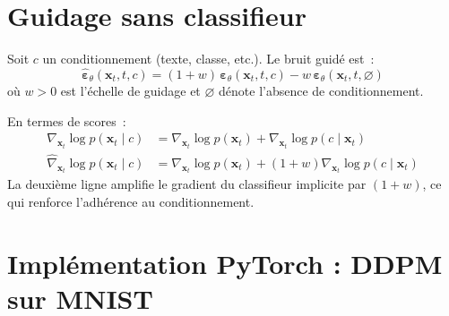 \section{Guidage sans classifieur}
\label{sec:cfg}

\begin{definition}
Soit $c$ un conditionnement (texte, classe, etc.). Le bruit guid\'e est~:
\begin{equation}
\hat{\boldsymbol{\varepsilon}}_\theta(\mathbf{x}_t, t, c) = (1 + w)\,\boldsymbol{\varepsilon}_\theta(\mathbf{x}_t, t, c) - w\,\boldsymbol{\varepsilon}_\theta(\mathbf{x}_t, t, \varnothing)
\label{eq:cfg}
\end{equation}
o\`u $w > 0$ est l'\'echelle de guidage et $\varnothing$ d\'enote l'absence
de conditionnement.
\end{definition}

\begin{mathbox}[title=\textbf{D\'erivation du guidage}]
En termes de scores~:
\begin{align}
\nabla_{\mathbf{x}_t} \log p(\mathbf{x}_t \mid c) &= \nabla_{\mathbf{x}_t} \log p(\mathbf{x}_t) + \nabla_{\mathbf{x}_t} \log p(c \mid \mathbf{x}_t) \\
\hat{\nabla}_{\mathbf{x}_t} \log p(\mathbf{x}_t \mid c) &= \nabla_{\mathbf{x}_t} \log p(\mathbf{x}_t) + (1 + w)\nabla_{\mathbf{x}_t} \log p(c \mid \mathbf{x}_t)
\end{align}
La deuxi\`eme ligne amplifie le gradient du classifieur implicite par $(1+w)$,
ce qui renforce l'adh\'erence au conditionnement.
\end{mathbox}

\section{Impl\'ementation PyTorch : DDPM sur MNIST}
\label{sec:ddpm-pytorch}

